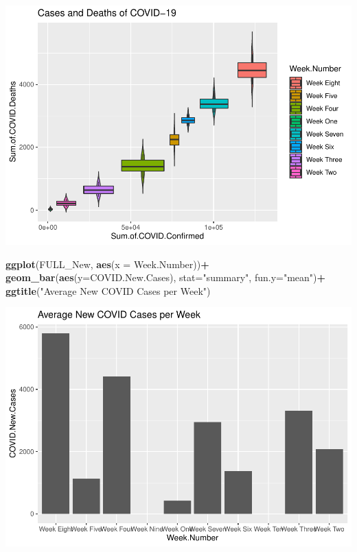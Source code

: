 \documentclass[
]{article}
\newenvironment{Shaded}{\begin{snugshade}}{\end{snugshade}}
\newcommand{\DataTypeTok}[1]{\textcolor[rgb]{0.13,0.29,0.53}{#1}}
\newcommand{\KeywordTok}[1]{\textcolor[rgb]{0.13,0.29,0.53}{\textbf{#1}}}
\newcommand{\NormalTok}[1]{#1}
\newcommand{\OperatorTok}[1]{\textcolor[rgb]{0.81,0.36,0.00}{\textbf{#1}}}
\newcommand{\StringTok}[1]{\textcolor[rgb]{0.31,0.60,0.02}{#1}}
\begin{document}
\begin{center}\includegraphics{project1_files/figure-latex/unnamed-chunk-4-3} \end{center}

\begin{Shaded}
\begin{Highlighting}[]
\KeywordTok{ggplot}\NormalTok{(FULL_New, }\KeywordTok{aes}\NormalTok{(}\DataTypeTok{x =}\NormalTok{ Week.Number))}\OperatorTok{+}
\KeywordTok{geom_bar}\NormalTok{(}\KeywordTok{aes}\NormalTok{(}\DataTypeTok{y=}\NormalTok{COVID.New.Cases), }\DataTypeTok{stat=}\StringTok{"summary"}\NormalTok{, }\DataTypeTok{fun.y=}\StringTok{"mean"}\NormalTok{)}\OperatorTok{+}
\StringTok{  }\KeywordTok{ggtitle}\NormalTok{(}\StringTok{"Average New COVID Cases per Week"}\NormalTok{)}
\end{Highlighting}
\end{Shaded}

\begin{center}\includegraphics{project1_files/figure-latex/unnamed-chunk-4-4} \end{center}
\end{document}
